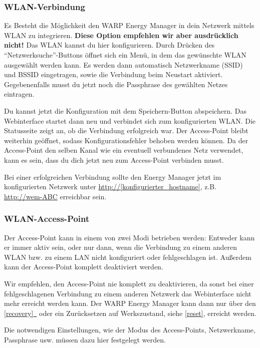 \documentclass[a4paper,10pt]{article}
\newcommand{\hint}[1]{\begin{tcolorbox}[colback=boxgray,colframe=black,coltext=
white,title=Hinweis,left*=2mm,right*=2mm,boxsep=1mm,bottom=1mm,top=1mm]#1\end{tcolorbox}}
\newcommand{\gfx}[1]{\texttt{[image: \#1]}}
\newcommand*{\fullref}[1]{\hyperref[{#1}]{\ref*{#1}~\nameref*{#1}}}
\begin{document}
\begin{multicols*}{2}


	\subsubsection{WLAN-Verbindung}
	Es Besteht die Möglichkeit den WARP Energy Manager in dein Netzwerk mittels
	WLAN zu integrieren. \textbf{Diese Option empfehlen wir aber ausdrücklich
	nicht!} Das WLAN kannst du hier konfigurieren.
	Durch Drücken des \enquote{Netzwerksuche}-Buttons öffnet sich ein Menü, in dem das gewünschte WLAN ausgewählt werden kann.
	Es werden dann automatisch Netzwerkname (SSID) und BSSID eingetragen, sowie die Verbindung beim Neustart aktiviert.
	Gegebenenfalls musst du jetzt noch die Passphrase des gewählten Netzes eintragen.

	Du kannst jetzt die Konfiguration mit dem Speichern-Button abspeichern.
	Das Webinterface startet dann neu und verbindet sich zum konfigurierten WLAN. Die Statusseite zeigt
	an, ob die Verbindung erfolgreich war. Der Access-Point bleibt weiterhin
	geöffnet, sodass Konfigurationsfehler behoben werden können.
	Da der Access-Point den selben Kanal wie ein eventuell verbundenes Netz verwendet,
	kann es sein, dass du dich jetzt neu zum Access-Point verbinden musst.

	Bei einer erfolgreichen Verbindung sollte den Energy Manager jetzt im konfigurierten Netzwerk unter
	\url{http://[konfigurierter_hostname]}, z.B. \url{http://wem-ABC} erreichbar sein.

	\subsubsection{WLAN-Access-Point}
	Der Access-Point kann in einem von zwei Modi betrieben werden: Entweder kann er immer aktiv sein,
	oder nur dann, wenn die Verbindung zu einem anderen WLAN bzw. zu einem LAN nicht konfiguriert oder fehlgeschlagen ist.
	Außerdem kann der Access-Point komplett deaktiviert werden.
	\hint{Wir empfehlen, den Access-Point nie komplett zu deaktivieren, da sonst bei einer
		fehlgeschlagenen Verbindung zu einem anderen Netzwerk das Webinterface nicht mehr erreicht
		werden kann. Der WARP Energy Manager kann dann nur über den \fullref{recovery} oder ein Zurücksetzen auf Werkszustand, siehe \ref{reset}, erreicht werden.}
	Die notwendigen Einstellungen, wie der Modus des Access-Points,
	Netzwerkname, Passphrase usw. müssen dazu hier festgelegt werden.


\end{multicols*}
\end{document}
